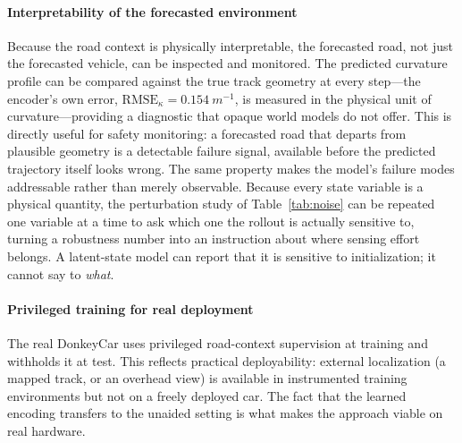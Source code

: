 \documentclass[preprint,12pt]{elsarticle}
\begin{document}
\paragraph{Interpretability of the forecasted environment}
Because the road context is physically interpretable, the forecasted road, not
just the forecasted vehicle, can be inspected and monitored.
The predicted curvature profile can be compared against the true track geometry at
every step---the encoder's own error, $\mathrm{RMSE}_\kappa =
\SI{0.154}{m^{-1}}$, is measured in the physical unit of curvature---providing a
diagnostic that opaque world models do not offer.
This is directly useful for safety monitoring: a forecasted road that departs from
plausible geometry is a detectable failure signal, available before the predicted
trajectory itself looks wrong.
The same property makes the model's failure modes addressable rather than merely
observable. Because every state variable is a physical quantity, the perturbation
study of Table~\ref{tab:noise} can be repeated one variable at a time to ask which
one the rollout is actually sensitive to, turning a robustness number into an
instruction about where sensing effort belongs. A latent-state model can report
that it is sensitive to initialization; it cannot say to \emph{what}.

\paragraph{Privileged training for real deployment}
The real DonkeyCar uses privileged road-context supervision at training and
withholds it at test.
This reflects practical deployability: external localization (a mapped track, or
an overhead view) is available in instrumented training environments but not on a
freely deployed car.
The fact that the learned encoding transfers to the unaided setting is what makes
the approach viable on real hardware.
\end{document}
